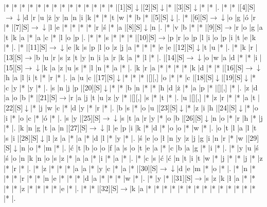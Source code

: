\documentclass[11pt]{article}
\newcommand\drarr{$\rightarrow \!\!\!\!\! \downarrow$}
\newcommand\rarr{$\rightarrow$}
\newcommand\darr{$\downarrow$}
\begin{document}
\noindent\begin{Puzzle}{19}{24}|*	|*	|*	|*	|*	|*	|*	|*	|*	|*	|*	|*	|*	|*	|[1][S]\darr	|[2][S]\darr	|*	|[3][S]\darr	|*	|*	|.
|*	|*	|[4][S]\drarr	|d	|r	|u	|ż	|y	|n	|n	|i	|k	|*	|*	|t	|w	|*	|b	|*	|[5][S]\darr	|.
|*	|[6][S]\drarr	|o	|g	|ó	|r	|*	|[7][S]\drarr	|l	|e	|*	|*	|*	|*	|r	|ś	|*	|a	|[8][S]\darr	|n	|.
|*	|v	|b	|*	|*	|[9][S]\rarr	|r	|o	|g	|a	|t	|k	|a	|*	|a	|c	|*	|l	|o	|p	|.
|*	|*	|s	|*	|*	|*	|[10][S]\rarr	|p	|r	|o	|p	|l	|i	|o	|p	|i	|t	|e	|k	|*	|.
|*	|[11][S]\drarr	|e	|k	|s	|p	|l	|o	|z	|j	|a	|*	|*	|*	|e	|e	|[12][S]\darr	|t	|u	|*	|.
|*	|k	|r	|[13][S]\rarr	|b	|u	|r	|s	|z	|t	|y	|n	|i	|a	|r	|k	|a	|*	|l	|*	|.
|[14][S]\drarr	|o	|w	|a	|d	|*	|*	|i	|[15][S]\drarr	|k	|a	|z	|u	|s	|*	|l	|n	|*	|a	|*	|.
|k	|r	|a	|*	|*	|*	|*	|k	|d	|*	|*	|[16][S]\drarr	|h	|a	|l	|i	|t	|*	|r	|*	|.
|a	|u	|c	|[17][S]\darr	|*	|*	|*	|[][,]{ }	|o	|*	|*	|c	|[18][S]\darr	|[19][S]\darr	|*	|c	|y	|*	|y	|*	|.
|s	|n	|j	|p	|[20][S]\darr	|*	|*	|b	|n	|*	|*	|h	|d	|ż	|*	|a	|p	|*	|[][,]{ }	|*	|.
|z	|d	|a	|o	|b	|*	|[21][S]\rarr	|r	|a	|j	|t	|u	|z	|y	|*	|[][,]{ }	|s	|*	|t	|*	|.
|u	|[][,]{ }	|*	|z	|r	|*	|*	|a	|t	|[22][S]\darr	|*	|j	|w	|c	|*	|d	|y	|*	|r	|*	|.
|b	|s	|*	|o	|u	|[23][S]\darr	|*	|z	|i	|h	|[24][S]\darr	|*	|o	|i	|*	|o	|c	|*	|ó	|*	|.
|s	|y	|[25][S]\drarr	|s	|t	|a	|r	|y	|*	|o	|b	|[26][S]\darr	|n	|o	|*	|r	|h	|*	|j	|*	|.
|k	|n	|g	|t	|a	|n	|[27][S]\drarr	|l	|e	|p	|i	|k	|*	|d	|*	|o	|o	|*	|w	|*	|.
|o	|t	|l	|a	|l	|t	|s	|i	|[28][S]\darr	|l	|z	|a	|*	|a	|*	|d	|l	|*	|y	|*	|.
|ś	|e	|o	|ł	|n	|y	|z	|j	|g	|i	|n	|r	|*	|w	|[29][S]\darr	|n	|o	|*	|m	|*	|.
|ć	|t	|b	|o	|o	|f	|a	|s	|o	|t	|e	|a	|*	|c	|b	|a	|g	|*	|i	|*	|.
|*	|y	|u	|ś	|ś	|o	|n	|k	|n	|o	|s	|z	|*	|a	|a	|*	|i	|*	|a	|*	|.
|*	|c	|s	|ć	|ć	|n	|t	|i	|t	|w	|*	|j	|*	|*	|j	|*	|z	|*	|r	|*	|.
|*	|z	|*	|*	|*	|a	|a	|*	|y	|c	|*	|a	|*	|[30][S]\drarr	|d	|e	|m	|*	|o	|*	|.
|*	|n	|*	|*	|*	|r	|*	|*	|n	|e	|*	|*	|*	|d	|a	|*	|*	|*	|w	|*	|.
|*	|y	|*	|[31][S]\rarr	|s	|z	|k	|ł	|a	|*	|*	|*	|*	|z	|*	|*	|*	|*	|e	|*	|.
|*	|*	|[32][S]\rarr	|k	|a	|*	|*	|*	|*	|*	|*	|*	|*	|*	|*	|*	|*	|*	|*	|*	|.\end{Puzzle}

\newpage
\end{document}
